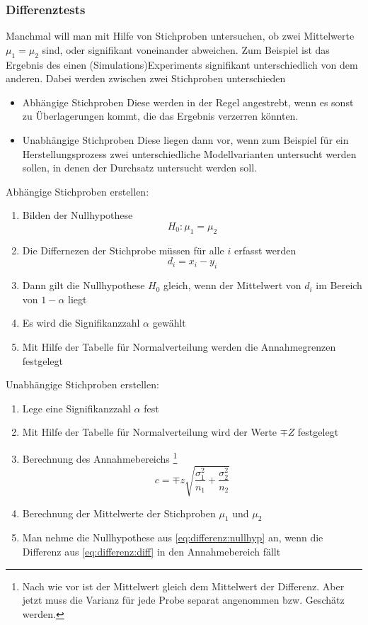 \subsubsection{Differenztests}
Manchmal will man mit Hilfe von Stichproben untersuchen, ob  zwei Mittelwerte $\mu_1 = \mu_2$ sind, oder signifikant voneinander abweichen. Zum Beispiel ist das Ergebnis des einen (Simulations)Experiments signifikant unterschiedlich von dem anderen.  Dabei werden zwischen zwei Stichproben unterschieden
\begin{itemize}
\item Abhängige Stichproben
\subitem Diese werden in der Regel angestrebt, wenn es sonst zu Überlagerungen kommt, die das Ergebnis verzerren könnten.
\item Unabhängige Stichproben
\subitem Diese liegen dann vor, wenn zum Beispiel für ein Herstellungsprozess zwei unterschiedliche Modellvarianten untersucht werden sollen, in denen der Durchsatz untersucht werden soll.
\end{itemize}
Abhängige Stichproben erstellen:
\begin{enumerate}
\item Bilden der Nullhypothese
\begin{equation}\label{eq:differenz:nullhyp}
H_0: \mu_1 = \mu_2
\end{equation}
\item Die Differnezen der Stichprobe müssen für alle $i$ erfasst werden
\begin{equation}\label{eq:differenz:diff}
d_i = x_i - y_i
\end{equation}
\item Dann gilt die Nullhypothese $H_0$ gleich, wenn der Mittelwert von $d_i$ im Bereich von $1-\alpha$ liegt
\item Es wird die Signifikanzzahl $\alpha$ gewählt
\item Mit Hilfe der Tabelle für Normalverteilung werden die Annahmegrenzen festgelegt
\end{enumerate}
Unabhängige Stichproben erstellen:
\begin{enumerate}
\item Lege eine Signifikanzzahl $\alpha$ fest
\item Mit Hilfe der Tabelle für Normalverteilung wird der Werte $\mp Z$ festgelegt
\item Berechnung des Annahmebereichs
\footnote{Nach wie vor ist der Mittelwert gleich dem Mittelwert der Differenz. Aber jetzt muss die Varianz für jede Probe separat angenommen bzw. Geschätz werden.}
\begin{equation}
c=\mp z\sqrt{\frac{\sigma_1^2}{n_1}+\frac{\sigma_2^2}{n_2}}
\end{equation}

\item Berechnung der Mittelwerte der Stichproben $\mu_1$ und $\mu_2$
\item Man nehme die Nullhypothese aus \autoref{eq:differenz:nullhyp} an, wenn die Differenz aus \autoref{eq:differenz:diff} in den Annahmebereich fällt
\end{enumerate}
